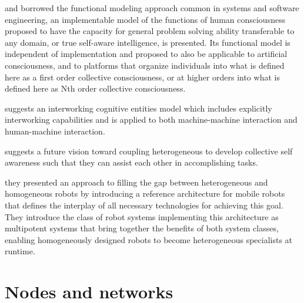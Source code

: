\documentclass{article}
\begin{document}
	\citet{williams-2019-a-model-for-human-artificial-collective-consciousness-part-1} and \citet{williams-2019-a-model-for-human-artificial-collective-consciousness-part-2} borrowed the functional modeling approach common in systems and software engineering, an implementable model of the functions of human consciousness proposed to have the capacity for general problem solving ability transferable to any domain, or true self-aware intelligence, is presented. Its functional model is independent of implementation and proposed to also be applicable to artificial consciousness, and to platforms that organize individuals into what is defined here as a first order collective consciousness, or at higher orders into what is defined here as Nth order collective consciousness.
	
	\cite{celentano-2016-multi-robot-systems-machine-machine-and-human-machine-interaction-and-their-modelling} suggests an interworking cognitive entities model which includes explicitly interworking capabilities and is applied to both machine-machine interaction and human-machine interaction.
	
	
	\cite{diaconescu-2017-architectures-for-collective-self-aware-computing-systems}
	\cite{gerasimou-2019-towards-systematic-engineering-of-collaborative-heterogeneous-robotic-systems} suggests a future vision toward coupling heterogeneous to develop collective self awareness such that they can assist each other in accomplishing tasks.
	
	\cite{kosak-2019-multipotent-systems-combining-planning-self-organization-and-reconfiguration-in-modular-robot-ensembles} they presented an approach to filling the gap between heterogeneous and homogeneous robots by introducing a reference architecture for mobile robots that defines the interplay of all necessary technologies for achieving this goal. They introduce the class of robot systems implementing this architecture as multipotent systems that bring together the benefits of both system classes, enabling homogeneously designed robots to become heterogeneous specialists at runtime.
	
	
	
	\section{Nodes and networks}
		\cite{agne-2016-self-aware-compute-nodes}
	
	
\end{document}
